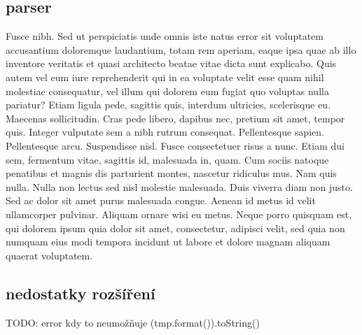 \documentclass[czech,master,dept460,male,cpp,cpdeclaration]{diploma}
\begin{document}
\subsection{parser}
Fusce nibh. Sed ut perspiciatis unde omnis iste natus error sit voluptatem accusantium doloremque laudantium, totam rem aperiam, eaque ipsa quae ab illo inventore veritatis et quasi architecto 
beatae vitae dicta sunt explicabo. Quis autem vel eum iure reprehenderit qui in ea voluptate velit esse quam nihil molestiae consequatur, vel illum qui dolorem eum fugiat quo voluptas nulla pariatur? Etiam ligula pede, sagittis quis, interdum ultricies, scelerisque eu. Maecenas sollicitudin. Cras pede libero, dapibus nec, pretium sit amet, tempor quis. Integer vulputate sem a nibh rutrum consequat. Pellentesque sapien. Pellentesque arcu. Suspendisse nisl. Fusce consectetuer risus a nunc. Etiam dui sem, fermentum vitae, sagittis id, malesuada in, quam. Cum sociis natoque penatibus et magnis dis parturient montes, nascetur ridiculus mus. Nam quis nulla. Nulla non lectus sed nisl molestie malesuada. Duis viverra diam non justo. Sed ac dolor sit amet purus malesuada congue. Aenean id metus id velit ullamcorper pulvinar. Aliquam ornare wisi eu metus. Neque porro quisquam est, qui dolorem ipsum quia dolor sit amet, consectetur, adipisci velit, sed quia non numquam eius modi tempora incidunt ut labore et dolore magnam aliquam quaerat voluptatem.

\subsection{nedostatky rozšíření}
TODO: error kdy to neumožňuje (tmp.format()).toString()
\end{document}
